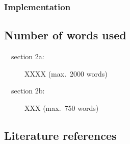 \subsubsection{Implementation}\label{sec:implementation}

\subsection{Number of words used}

\begin{description}
\item[~~section 2a:] XXXX (max.\ 2000 words)
\item[~~section 2b:] XXX (max.\ 750 words)
\end{description}

\newpage

\subsection{Literature references}


\printbibliography[notcategory=fullcited]
